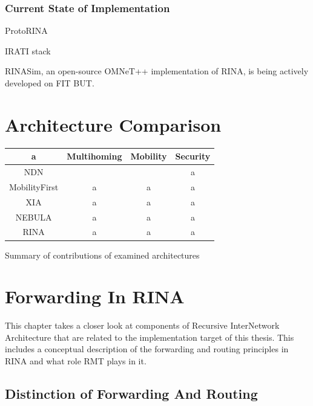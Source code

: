         \subsection{Current State of Implementation}

            ProtoRINA

            IRATI stack

            RINASim, an open-source OMNeT++ implementation of RINA, is being actively developed on FIT BUT.


\chapter{Architecture Comparison}\label{comparison}

    \begin{listing}
        \centering
        \begin{tabular}{ | c | c | c | c | }
            \hline
            a & Multihoming & Mobility & Security \\
            \hline
            NDN & \cmark & \xmark & a \\
            \hline
            MobilityFirst & a & a & a \\
            \hline
            XIA & a & a & a \\
            \hline
            NEBULA & a & a & a \\
            \hline
            RINA & a & a & a \\
            \hline
        \end{tabular}
        \caption{Summary of contributions of examined architectures}\label{comparison:table}
    \end{listing}


\chapter{Forwarding In RINA}\label{forwarding}

    This chapter takes a closer look at components of Recursive InterNetwork Architecture that are related to the implementation target of this thesis. This includes a conceptual description of the forwarding and routing principles in RINA and what role RMT plays in it.

    \section{Distinction of Forwarding And Routing}

